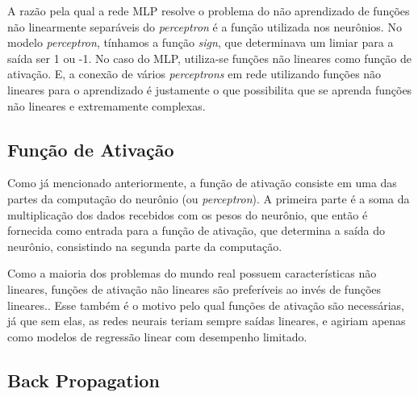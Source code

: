 A razão pela qual a rede \ac{MLP} resolve o problema do não aprendizado de funções não linearmente separáveis do \textit{perceptron} é a função utilizada nos neurônios. No modelo \textit{perceptron}, tínhamos a função \textit{sign}, que determinava um limiar para a saída ser 1 ou -1. No caso do \ac{MLP}, utiliza-se funções não lineares como função de ativação. E, a conexão de vários \textit{perceptrons} em rede utilizando funções não lineares para o aprendizado é justamente o que possibilita que se aprenda funções não lineares e extremamente complexas. \cite{MLP_gardner}


\subsection{Função de Ativação}
Como já mencionado anteriormente, a função de ativação consiste em uma das partes da computação do neurônio (ou \textit{perceptron}). A primeira parte é a soma da multiplicação dos dados recebidos com os pesos do neurônio, que então é fornecida como entrada para a função de ativação, que determina a saída do neurônio, consistindo na segunda parte da computação.

Como a maioria dos problemas do mundo real possuem características não lineares, funções de ativação não lineares são preferíveis ao invés de funções lineares.\cite{activation_functions_ann_sharma}. Esse também é o motivo pelo qual funções de ativação são necessárias, já que sem elas, as redes neurais teriam sempre saídas lineares, e agiriam apenas como modelos de regressão linear com desempenho limitado.\cite{tcc_anomalia_2021}




\subsection{Back Propagation}



